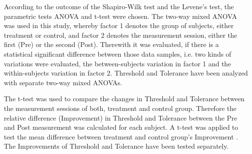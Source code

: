 According to the outcome of the Shapiro-Wilk test and the Levene’s test, the parametric tests ANOVA and t-test were chosen.
The two-way mixed ANOVA was used in this study, whereby factor 1 denotes the group of subjects, either treatment or control, and factor 2 denotes the measurement session, either the first (Pre) or the second (Post). Therewith it was evaluated, if there is a statistical significant difference between those data samples, i.e. 
two kinds of variations were evaluated, the between-subjects variation in factor 1 and the within-subjects variation in factor 2. 
Threshold and Tolerance have been analyzed with separate two-way mixed ANOVAs. \cite{Mooi2018}

The t-test was used to compare the changes in Threshold and Tolerance between the measurement sessions of both, treatment and control group. Therefore the relative difference (Improvement) in Threshold and Tolerance between the Pre and Post measurement was calculated for each subject. A t-test was applied to test the mean difference between treatment and control group’s Improvement \cite{Mooi2018}. The Improvements of Threshold and Tolerance have been tested separately. 


 



